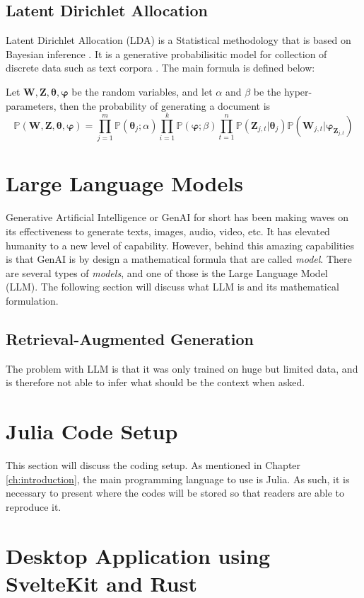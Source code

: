 \subsection{Latent Dirichlet Allocation}\label{sec:lda}
Latent Dirichlet Allocation (LDA) is a Statistical methodology that is based on Bayesian inference \cite{bayes,laplace1986}. It is a generative probabilisitic model for collection of discrete data such as text corpora \cite{blei2003latent}. The main formula is defined below:
\begin{defnx}
Let $\mathbf{W},\mathbf{Z},\boldsymbol{\theta},\boldsymbol{\varphi}$ be the random variables, and let $\alpha$ and $\beta$ be the hyper-parameters, then the probability of generating a document is
\begin{equation}
    \mathbb{P}(\mathbf{W},\mathbf{Z},\boldsymbol{\theta},\boldsymbol{\varphi})=\prod_{j=1}^m\mathbb{P}(\boldsymbol{\theta}_j;\alpha)\prod_{i=1}^{k}\mathbb{P}(\boldsymbol{\varphi};\beta)\prod_{t=1}^{n}\mathbb{P}(\mathbf{Z}_{j,t}|\boldsymbol{\theta}_j)\mathbb{P}(\mathbf{W}_{j,t}|\boldsymbol{\varphi}_{\mathbf{Z}_{j,t}})
\end{equation}
\end{defnx}
\section{Large Language Models}\label{sec:llm_method}
Generative Artificial Intelligence or GenAI for short has been making waves on its effectiveness to generate texts, images, audio, video, etc. It has elevated humanity to a new level of capability. However, behind this amazing capabilities is that GenAI is by design a mathematical formula that are called \textit{model}. There are several types of \textit{models}, and one of those is the Large Language Model (LLM). The following section will discuss what LLM is and its mathematical formulation.
\subsection{Retrieval-Augmented Generation}
The problem with LLM is that it was only trained on huge but limited data, and is therefore not able to infer what should be the context when asked.
\section{Julia Code Setup}\label{sec:code_setup}
This section will discuss the coding setup. As mentioned in Chapter \ref{ch:introduction}, the main programming language to use is Julia. As such, it is necessary to present where the codes will be stored so that readers are able to reproduce it.

\section{Desktop Application using SvelteKit and Rust}
